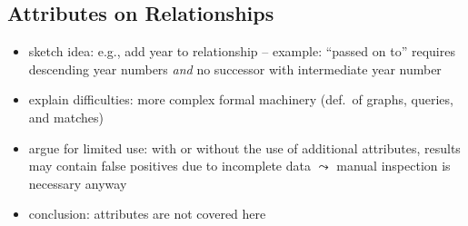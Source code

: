 
\subsection*{Attributes on Relationships}

\begin{itemize}
  \item
    sketch idea: e.g., add year to relationship  -- example: \enquote{passed on to} requires descending year numbers \emph{and} no successor with intermediate year number
  \item
    explain difficulties: more complex formal machinery (def.\ of graphs, queries, and matches)
  \item
    argue for limited use: with or without the use of additional attributes, results may contain false positives due to incomplete data $\leadsto$ manual inspection is necessary anyway
  \item
    conclusion: attributes are not covered here
\end{itemize}

